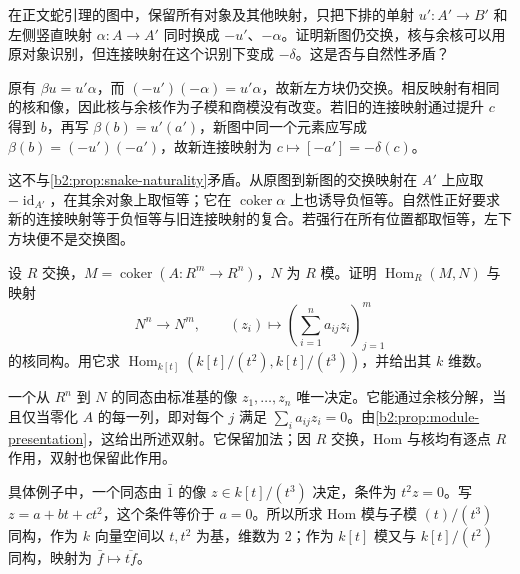 \begin{optionalexercise}\label{b2:ex:03-snake-sign}
	在正文蛇引理的图中，保留所有对象及其他映射，只把下排的单射 \(u':A'\to B'\) 和左侧竖直映射 \(\alpha:A\to A'\) 同时换成 \(-u'\)、\(-\alpha\)。证明新图仍交换，核与余核可以用原对象识别，但连接映射在这个识别下变成 \(-\delta\)。这是否与自然性矛盾？
\end{optionalexercise}
\begin{solution}
	原有 \(\beta u=u'\alpha\)，而 \((-u')(-\alpha)=u'\alpha\)，故新左方块仍交换。相反映射有相同的核和像，因此核与余核作为子模和商模没有改变。若旧的连接映射通过提升 \(c\) 得到 \(b\)，再写 \(\beta(b)=u'(a')\)，新图中同一个元素应写成 \(\beta(b)=(-u')(-a')\)，故新连接映射为 \(c\mapsto[-a']=-\delta(c)\)。

	这不与\cref{b2:prop:snake-naturality}矛盾。从原图到新图的交换映射在 \(A'\) 上应取 \(-\operatorname{id}_{A'}\)，在其余对象上取恒等；它在 \(\operatorname{coker}\alpha\) 上也诱导负恒等。自然性正好要求新的连接映射等于负恒等与旧连接映射的复合。若强行在所有位置都取恒等，左下方块便不是交换图。
\end{solution}

\begin{exercise}\label{b2:ex:03-hom-from-presentation}
	设 \(R\) 交换，\(M=\operatorname{coker}(A:R^m\to R^n)\)，\(N\) 为 \(R\) 模。证明 \(\operatorname{Hom}_R(M,N)\) 与映射
	\[
		N^n\longrightarrow N^m,\qquad (z_i)\longmapsto \left(\sum_{i=1}^n a_{ij}z_i\right)_{j=1}^m
	\]
	的核同构。用它求 \(\operatorname{Hom}_{k[t]}(k[t]/(t^2),k[t]/(t^3))\)，并给出其 \(k\) 维数。
\end{exercise}
\begin{solution}
	一个从 \(R^n\) 到 \(N\) 的同态由标准基的像 \(z_1,\ldots,z_n\) 唯一决定。它能通过余核分解，当且仅当零化 \(A\) 的每一列，即对每个 \(j\) 满足 \(\sum_i a_{ij}z_i=0\)。由\cref{b2:prop:module-presentation}，这给出所述双射。它保留加法；因 \(R\) 交换，Hom 与核均有逐点 \(R\) 作用，双射也保留此作用。

	具体例子中，一个同态由 \(\bar1\) 的像 \(z\in k[t]/(t^3)\) 决定，条件为 \(t^2z=0\)。写 \(z=a+bt+ct^2\)，这个条件等价于 \(a=0\)。所以所求 Hom 模与子模 \((t)/(t^3)\) 同构，作为 \(k\) 向量空间以 \(t,t^2\) 为基，维数为 \(2\)；作为 \(k[t]\) 模又与 \(k[t]/(t^2)\) 同构，映射为 \(\bar f\mapsto\overline{tf}\)。
\end{solution}
